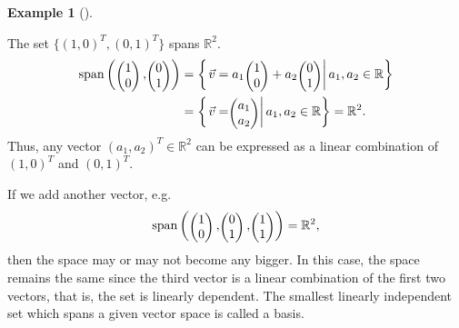 \documentclass[
  a4paper,
  DIV=11,
  numbers=noendperiod,
  oneside]{scrreprt}
\theoremstyle{definition}
\newtheorem{example}{Example}[chapter]
\theoremstyle{remark}
\begin{document}
\begin{example}[]\protect\hypertarget{exm-}{}\label{exm-}

The set \(\{(1,0)^{T},(0,1)^{T}\}\) spans \(\mathbb{R}^{2}\).
\[\begin{aligned}
{\rm span}\left(\scriptscriptstyle \begin{pmatrix}   1\\0  \end{pmatrix} \textstyle,\scriptscriptstyle \begin{pmatrix}   0\\1  \end{pmatrix} \textstyle\right) & = \left\{ \left. \vec{v} = a_1 \scriptscriptstyle \begin{pmatrix}   1\\0  \end{pmatrix} \textstyle + a_2 \scriptscriptstyle \begin{pmatrix}   0\\1  \end{pmatrix} \textstyle\right| a_1,a_2 \in \mathbb{R} \right\} \\
& = \left\{ \left. \vec{v} = \scriptscriptstyle \begin{pmatrix}   a_1\\a_2  \end{pmatrix} \textstyle \right| a_1,a_2 \in \mathbb{R} \right\} =    \mathbb{R}^{2}. 
\end{aligned}\] Thus, any vector \((a_{1},a_{2})^{T}\in\mathbb{R}^{2}\)
can be expressed as a linear combination of \((1,0)^{T}\) and
\((0,1)^{T}\).

\end{example}

If we add another vector, e.g.
\[{\rm span}\left(\scriptscriptstyle \begin{pmatrix}   1\\0  \end{pmatrix} \textstyle,\scriptscriptstyle \begin{pmatrix}   0\\1  \end{pmatrix} \textstyle, \scriptscriptstyle \begin{pmatrix}   1\\1  \end{pmatrix} \textstyle \right) =\mathbb{R}^{2},\]
then the space may or may not become any bigger. In this case, the space
remains the same since the third vector is a linear combination of the
first two vectors, that is, the set is linearly dependent. The smallest
linearly independent set which spans a given vector space is called a
basis.
\end{document}
